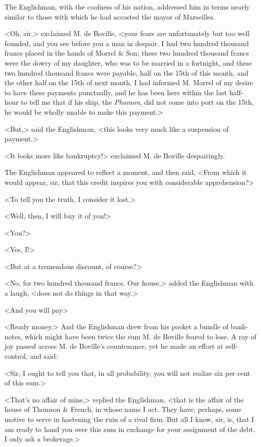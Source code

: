  The Englishman, with the coolness of his nation, addressed him in terms nearly similar to those with which he had accosted the mayor of Marseilles. 

 <Oh, sir,> exclaimed M. de Boville, <your fears are unfortunately but too well founded, and you see before you a man in despair. I had two hundred thousand francs placed in the hands of Morrel \& Son; these two hundred thousand francs were the dowry of my daughter, who was to be married in a fortnight, and these two hundred thousand francs were payable, half on the 15th of this month, and the other half on the 15th of next month. I had informed M. Morrel of my desire to have these payments punctually, and he has been here within the last half-hour to tell me that if his ship, the \textit{Pharaon}, did not come into port on the 15th, he would be wholly unable to make this payment.> 

 <But,> said the Englishman, <this looks very much like a suspension of payment.> 

 <It looks more like bankruptcy!> exclaimed M. de Boville despairingly. 

 The Englishman appeared to reflect a moment, and then said, <From which it would appear, sir, that this credit inspires you with considerable apprehension?> 

 <To tell you the truth, I consider it lost.> 

 <Well, then, I will buy it of you!> 

 <You?> 

 <Yes, I!> 

 <But at a tremendous discount, of course?> 

 <No, for two hundred thousand francs. Our house,> added the Englishman with a laugh, <does not do things in that way.> 

 <And you will pay\longdash> 

 <Ready money.>  And the Englishman drew from his pocket a bundle of bank-notes, which might have been twice the sum M. de Boville feared to lose. A ray of joy passed across M. de Boville's countenance, yet he made an effort at self-control, and said: 

 <Sir, I ought to tell you that, in all probability, you will not realize six per cent of this sum.> 

 <That's no affair of mine,> replied the Englishman, <that is the affair of the house of Thomson \& French, in whose name I act. They have, perhaps, some motive to serve in hastening the ruin of a rival firm. But all I know, sir, is, that I am ready to hand you over this sum in exchange for your assignment of the debt. I only ask a brokerage.> 

